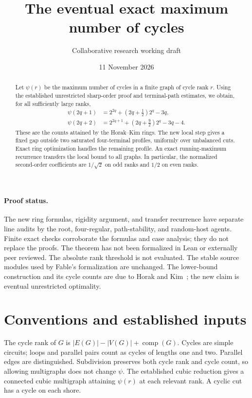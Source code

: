 \documentclass[11pt]{article}
\title{The eventual exact maximum number of cycles}
\author{Collaborative research working draft}
\date{11 November 2026}
\begin{document}
\maketitle
\begin{abstract}
Let $\psi(r)$ be the maximum number of cycles in a finite graph of cycle rank $r$.
Using the established unrestricted sharp-order proof and terminal-path estimates, we obtain, for all sufficiently large ranks,
\[
\begin{aligned}
 \psi(2q+1)&=2^{2q}+(2q+\tfrac12)2^q-3q,\\
 \psi(2q+2)&=2^{2q+1}+(2q+\tfrac92)2^q-3q-4.
\end{aligned}
\]
These are the counts attained by the Horak--Kim rings.
The new local step gives a fixed gap outside two saturated four-terminal profiles, uniformly over unbalanced cuts.
Exact ring optimization handles the remaining profile.
An exact running-maximum recurrence transfers the local bound to all graphs.
In particular, the normalized second-order coefficients are $1/\sqrt2$ on odd ranks and $1/2$ on even ranks.
\end{abstract}

\paragraph{Proof status.}
The new ring formulas, rigidity argument, and transfer recurrence have separate line audits by the root, four-regular, path-stability, and random-host agents.
Finite exact checks corroborate the formulas and case analysis; they do not replace the proofs.
The theorem has not been formalized in Lean or externally peer reviewed.
The absolute rank threshold is not evaluated.
The stable source modules used by Fable's formalization are unchanged.
The lower-bound construction and its cycle counts are due to Horak and Kim~\cite{HK}; the new claim is eventual unrestricted optimality.

\clearpage
\tableofcontents

\section{Conventions and established inputs}
The cycle rank of $G$ is $|E(G)|-|V(G)|+\operatorname{comp}(G)$.
Cycles are simple circuits; loops and parallel pairs count as cycles of lengths one and two.
Parallel edges are distinguished.
Subdivision preserves both cycle rank and cycle count, so allowing multigraphs does not change $\psi$.
The established cubic reduction gives a connected cubic multigraph attaining $\psi(r)$ at each relevant rank.
A cyclic cut has a cycle on each shore.
\end{document}
